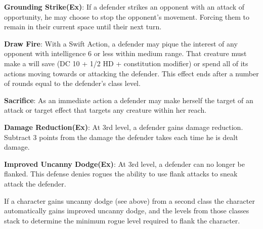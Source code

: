 \textbf{Grounding Strike(Ex)}: If a defender strikes an opponent with an attack of opportunity, he may choose to stop the opponent's movement. Forcing them to remain in their current space until their next turn.

\textbf{Draw Fire}: With a Swift Action, a defender may pique the interest of any opponent with intelligence 6 or less within medium range. That creature must make a will save (DC 10 + 1/2 HD + constitution modifier) or spend all of its actions moving towards or attacking the defender. This effect ends after a number of rounds equal to the defender’s class level.

\textbf{Sacrifice}: As an immediate action a defender may make herself the target of an attack or target effect that targets any creature within her reach.

\textbf{Damage Reduction(Ex)}: At 3rd level, a defender gains damage reduction. Subtract 3 points from the damage the defender takes each time he is dealt damage.

\textbf{Improved Uncanny Dodge(Ex)}: At 3rd level, a defender can no longer be flanked. This defense denies rogues the ability to use flank attacks to sneak attack the defender.

If a character gains uncanny dodge (see above) from a second class the character automatically gains improved uncanny dodge, and the levels from those classes stack to determine the minimum rogue level required to flank the character.